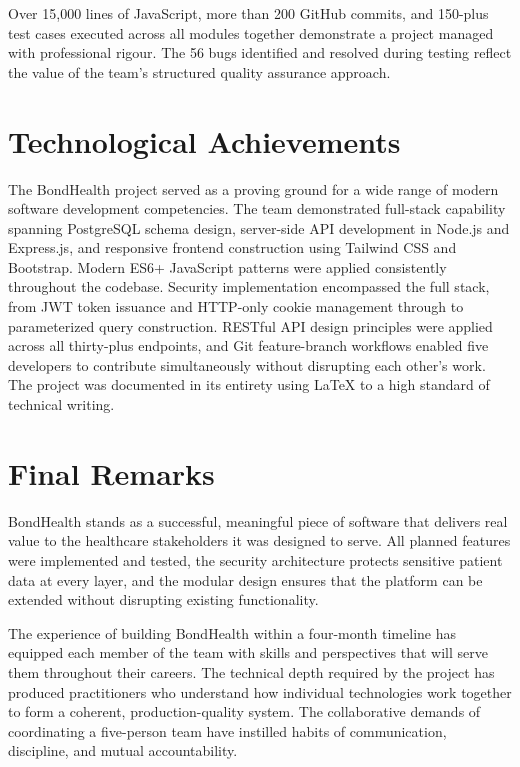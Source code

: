 \noindent Over 15,000 lines of JavaScript, more than 200 GitHub commits, and 150-plus test cases executed across all modules together demonstrate a project managed with professional rigour. The 56 bugs identified and resolved during testing reflect the value of the team's structured quality assurance approach.

\section{Technological Achievements}

\noindent The BondHealth project served as a proving ground for a wide range of modern software development competencies. The team demonstrated full-stack capability spanning PostgreSQL schema design, server-side API development in Node.js and Express.js, and responsive frontend construction using Tailwind CSS and Bootstrap. Modern ES6+ JavaScript patterns were applied consistently throughout the codebase. Security implementation encompassed the full stack, from JWT token issuance and HTTP-only cookie management through to parameterized query construction. RESTful API design principles were applied across all thirty-plus endpoints, and Git feature-branch workflows enabled five developers to contribute simultaneously without disrupting each other's work. The project was documented in its entirety using LaTeX to a high standard of technical writing.

\section{Final Remarks}

\noindent BondHealth stands as a successful, meaningful piece of software that delivers real value to the healthcare stakeholders it was designed to serve. All planned features were implemented and tested, the security architecture protects sensitive patient data at every layer, and the modular design ensures that the platform can be extended without disrupting existing functionality.

\noindent The experience of building BondHealth within a four-month timeline has equipped each member of the team with skills and perspectives that will serve them throughout their careers. The technical depth required by the project has produced practitioners who understand how individual technologies work together to form a coherent, production-quality system. The collaborative demands of coordinating a five-person team have instilled habits of communication, discipline, and mutual accountability.

